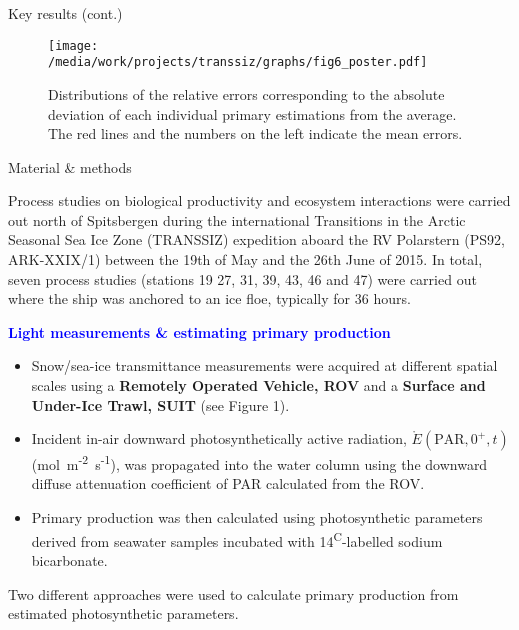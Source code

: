 \documentclass[final]{beamer}
\newlength{\colwidth}
\newcommand{\eparzero}{\ensuremath{\mathring{E}(\text{PAR}, 0^+, t)}}
\newcommand{\micromol}{\textmu mol~m\textsuperscript{-2}~s\textsuperscript{-1}}
\begin{document}
\begin{frame}[t]
\begin{columns}[t]
\begin{column}{\colwidth}
\begin{block}{Key results (cont.)}
				\begin{figure}
					\centering
					\texttt{[image: /media/work/projects/transsiz/graphs/fig6\_poster.pdf]}
					\caption{Distributions of the relative errors corresponding to the absolute deviation of each individual primary estimations from the average. The red lines and the numbers on the left indicate the mean errors.}
				\end{figure}

			\end{block}

			\begin{block}{\small Material \& methods}

				\footnotesize

				Process studies on biological productivity and ecosystem interactions were carried out north of Spitsbergen during the international Transitions in the Arctic Seasonal Sea Ice Zone (TRANSSIZ) expedition aboard the RV Polarstern (PS92, ARK-XXIX/1) between the 19th of May and the 26th June of 2015. In total, seven process studies (stations 19 27, 31, 39, 43, 46 and 47) were carried out where the ship was anchored to an ice floe, typically for 36 hours.

				\textcolor{blue}{\textbf{Light measurements \& estimating primary production}}

				\begin{itemize}
					\justifying
					\item Snow/sea-ice transmittance measurements were acquired at different spatial scales using a \textbf{Remotely Operated Vehicle, ROV} and a \textbf{Surface and Under-Ice Trawl, SUIT} (see Figure 1).
					\item Incident in-air downward photosynthetically active radiation, \eparzero{} (\micromol{}), was propagated into the water column using the downward diffuse attenuation coefficient of PAR calculated from the ROV.
					\item Primary production was then calculated using photosynthetic parameters derived from seawater samples incubated with 14\textsuperscript{C}-labelled sodium bicarbonate.
				\end{itemize}

				Two different approaches were used to calculate primary production from estimated photosynthetic parameters.


\end{block}
\end{column}
\end{columns}
\end{frame}
\end{document}
